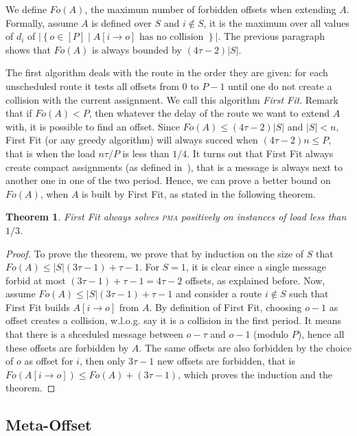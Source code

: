 \documentclass[10pt, conference, letterpaper]{IEEEtran}
\newtheorem{theorem}{Theorem}
\newcommand\pma{\textsc{pma}\xspace}
\begin{document}
We define $Fo(A)$, the maximum number of forbidden offsets when 
extending $A$. Formally, assume $A$ is defined over $S$ and $i\notin S$, 
it is the maximum over all values of $d_i$ of $|\left\{ o \in [P] \mid A[i \rightarrow o] \text{ has no collision }\right\}|$. The previous paragraph shows that $Fo(A)$ is always bounded by $(4 \tau -2)|S|$. 

The first algorithm deals with the route in the order they are given:  for each unscheduled route it tests all offsets from $0$ to $P-1$ until one do not create a collision with the current assignment.
We call this algorithm \emph{First Fit}. Remark that if $Fo(A) < P$, then whatever the delay of the route we want to extend $A$ with, it is possible to find an offset. Since $Fo(A) \leq (4 \tau -2)|S|$ and $|S| < n$, First Fit (or any greedy algorithm) will always succed when $(4 \tau -2)n \leq P$, that is when the load $ n\tau /P$ is less than $1/4$.
It turns out that First Fit always create compact assignments (as defined in~\cite{barth2018deterministic}), that is a message is always next to another one in one of the two period. Hence, we can prove a better bound on $Fo(A)$, when $A$ is built by First Fit, as stated in the following theorem.

\begin{theorem}
First Fit always solves \pma positively on instances of load less than $1/3$. 
\end{theorem}
\begin{proof}
To prove the theorem, we prove that by induction on the size of $S$ that $Fo(A) \leq |S|(3\tau -1) + \tau -1$.  For $S = 1$, it is clear since a single message forbid at most $(3\tau -1) + \tau -1 = 4\tau-2$ offsets, as explained before. Now, assume $Fo(A) \leq |S|(3\tau -1) + \tau -1$ and consider a route $i \notin S$ such that First Fit builds $A[i \rightarrow o]$ from $A$. By definition of First Fit, choosing $o-1$ as offset creates a collision, w.l.o.g. 
say it is a collision in the first period. It means that there is a shceduled message between $o - \tau $ and $o-1$ (modulo $P$), hence all these offsets are forbidden by $A$.
The same offsets are also forbidden by the choice of $o$ as offset for $i$, then only $3\tau -1$ new offsets are forbidden, that is $Fo(A[i \rightarrow o]) \leq Fo(A) + (3\tau -1)$,
which proves the induction and the theorem.
\end{proof}


\subsection{Meta-Offset}
\end{document}
